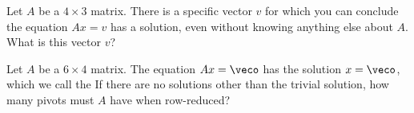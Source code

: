 \endedxproblem




Let $A$ be a $4\times 3$ matrix.  There is a specific 
vector $v$ for which you can conclude the equation $Ax = v$ has a solution, even without knowing
anything else about $A$.  What is this vector $v$?  







\endedxproblem




\endedxvertical











Let $A$ be a $6\times 4$ matrix.  The equation $Ax = \veco$ has the solution $x = \veco$, which we
call the  {}  If there are no solutions other than the trivial solution,
how many pivots must $A$ have when row-reduced?  



